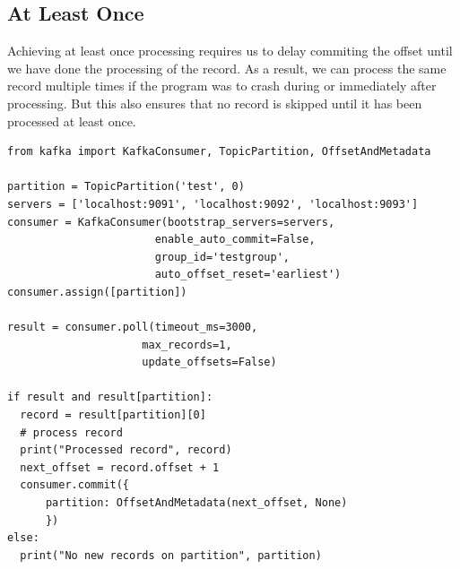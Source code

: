 \documentclass[11pt]{article}
\begin{document}
\subsection{At Least Once}
Achieving at least once processing requires us to delay commiting the offset until we have done the processing of the record. As a result, we can process the same record multiple times if the program was to crash during or immediately after processing. But this also ensures that no record is skipped until it has been processed at least once.
\newline
\begin{adjustwidth}{-30pt}{0pt}
\begin{Verbatim}
from kafka import KafkaConsumer, TopicPartition, OffsetAndMetadata

partition = TopicPartition('test', 0)
servers = ['localhost:9091', 'localhost:9092', 'localhost:9093']
consumer = KafkaConsumer(bootstrap_servers=servers,
                       enable_auto_commit=False,
                       group_id='testgroup',
                       auto_offset_reset='earliest')
consumer.assign([partition])

result = consumer.poll(timeout_ms=3000,
                     max_records=1,
                     update_offsets=False)

if result and result[partition]:
  record = result[partition][0]
  # process record
  print("Processed record", record)
  next_offset = record.offset + 1
  consumer.commit({
      partition: OffsetAndMetadata(next_offset, None)
      })
else:
  print("No new records on partition", partition)
\end{Verbatim}
\end{adjustwidth}

\clearpage
\end{document}
